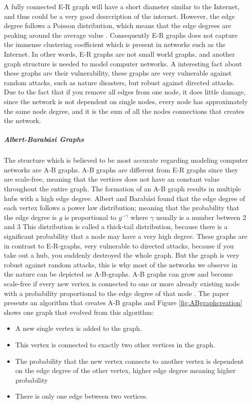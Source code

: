 A fully connected E-R graph will have a short diameter similar to the Internet, and thus could be a very good desrcription of the internet. However, the edge degree follows a Poisson distribution, which means that the edge degrees are peaking around the average value \cite{audestad}. Consequently E-R graphs does not capture the immense clustering coefficient which is present in networks such as the Internet. In other words, E-R graphs are not small world graphs, and another graph structure is needed to model computer networks.
A interesting fact about these graphs are their vulnerability, these graphs are very vulnerable against random attacks, such as nature disasters, but robust against directed attacks. Due to the fact that if you remove all edges from one node, it does little damage, since the network is not dependent on single nodes, every node has approximately the same node degree, and it is the sum of all the nodes connections that creates the network.

\subparagraph{\label{ABgraph}Albert-Barabási Graphs}
The structure which is believed to be most accurate regarding modeling computer networks are A-B graphs. A-B graphs are different from E-R graphs since they are scale-free, meaning that the vertices does not have an constant value throughout the entire graph. The formation of an A-B graph results in multiple hubs with a high edge degree. Albert and Barabási found that the edge degree of each vertex follows a power law distribution; meaning that the probability that the edge degree is $g$ is proportional to $g^{-\gamma}$
where $\gamma$ usually is a number between 2 and 3  This distribution is called a thick-tail distribution, because there is a significant probability that a node may have a very high degree. \cite{audestad}
These graphs are in contrast to E-R-graphs, very vulnerable to directed attacks, because if you take out a hub, you suddenly destroyed the whole graph. But the graph is very robust against random attacks, this is why most of the networks we observe in the nature can be depicted as A-B-graphs.
A-B graphs can grow and become scale-free if every new vertex is connected to one or more already existing node with a probability proportional to the edge degree of that node . The paper presents an algorithm that creates A-B graphs and Figure \ref{fig:ABgraphcreation} shows one graph that evolved from this algorithm:

\begin{itemize}
\item A new single vertex is added to the graph.
\item This vertex is connected to exactly two other vertices in the graph.
\item The probability that the new vertex connects to another vertex is dependent on the edge degree of the other vertex, higher edge degree meaning higher probability
\item There is only one edge between two vertices.
\end{itemize}


